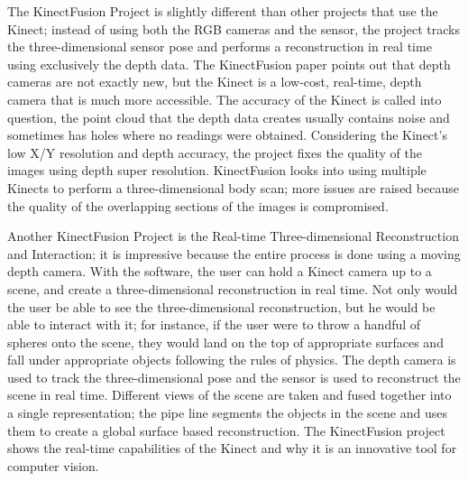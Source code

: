 \documentclass[pdftex,10.5pt]{report}
\begin{document}
The KinectFusion Project is slightly different than other projects that use the Kinect; instead of using both the RGB cameras and the sensor, the project tracks the three-dimensional sensor pose and performs a reconstruction in real time using exclusively the depth data. The KinectFusion paper points out that depth cameras are not exactly new, but the Kinect is a low-cost, real-time, depth camera that is much more accessible. The accuracy of the Kinect is called into question, the point cloud that the depth data creates usually contains noise and sometimes has holes where no readings were obtained. Considering the Kinect's low X/Y resolution and depth accuracy, the project fixes the quality of the images using depth super resolution. KinectFusion looks into using multiple Kinects to perform a three-dimensional body scan; more issues are raised because the quality of the overlapping sections of the images is compromised.

Another KinectFusion Project is the Real-time Three-dimensional Reconstruction and Interaction; it is impressive because the entire process is done using a moving depth camera. With the software, the user can hold a Kinect camera up to a scene, and create a three-dimensional reconstruction in real time. Not only would the user be able to see the three-dimensional reconstruction, but he would be able to interact with it; for instance, if the user were to throw a handful of spheres onto the scene, they would land on the top of appropriate surfaces and fall under appropriate objects following the rules of physics. The depth camera is used to track the three-dimensional pose and the sensor is used to reconstruct the scene in real time. Different views of the scene are taken and fused together into a single representation; the pipe line segments the objects in the scene and uses them to create a global surface based reconstruction. The KinectFusion project shows the real-time capabilities of the Kinect and why it is an innovative tool for computer vision.
\end{document}

